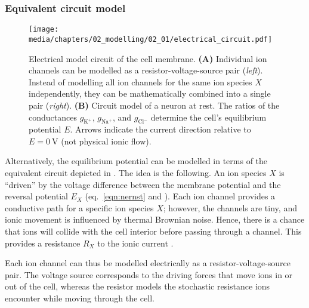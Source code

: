 \subsubsection{Equivalent circuit model}
\begin{figure}
	\centering
	\texttt{[image: media/chapters/02\_modelling/02\_01/electrical\_circuit.pdf]}
	{\label{fig:electrical_circuit_individual_channels}}
	{\label{fig:electrical_circuit_membrane}}
	\caption[Electrical circuit model of the cell membrane]{Electrical model circuit of the cell membrane.
	\textbf{(A)} Individual ion channels can be modelled as a resistor-voltage-source pair (\emph{left}).
	Instead of modelling all ion channels for the same ion species $X$ independently, they can be mathematically combined into a single pair (\emph{right}).
	\textbf{(B)} Circuit model of a neuron at rest. The ratios of the conductances $g_\mathrm{K^+}$, $g_\mathrm{Na^+}$, and $g_\mathrm{Cl^-}$ determine the cell's equilibrium potential $E$. Arrows indicate the current direction relative to $E = \SI{0}{\volt}$ (not physical ionic flow).}
	\label{fig:electrical_circuit}
\end{figure}
Alternatively, the equilibrium potential can be modelled in terms of the equivalent circuit depicted in .
The idea is the following.
An ion species $X$ is \enquote{driven} by the voltage difference between the membrane potential \vMem and the reversal potential  $E_X$ (eq.~\ref{eqn:nernst} and ).
Each ion channel provides a conductive path for a specific ion species $X$; however, the channels are tiny, and ionic movement is influenced by thermal Brownian noise.
Hence, there is a chance that ions will collide with the cell interior before passing through a channel.
This provides a resistance $R_X$ to the ionic current \citep{enderle2011bioelectric}.

Each ion channel can thus be modelled electrically as a resistor-voltage-source pair.
The voltage source corresponds to the driving forces that move ions in or out of the cell, whereas the resistor models the stochastic resistance ions encounter while moving through the cell.

